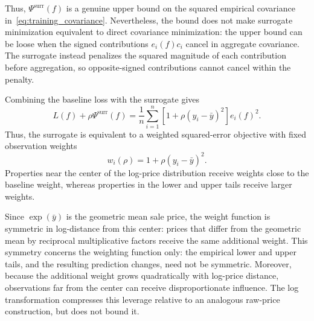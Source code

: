 \documentclass[10pt]{article}
\theoremstyle{definition}
\newcommand{\1}{\mathbf{1}}
\begin{document}
{{{Thus, $\Psi^{\mathrm{surr}}(f)$ is a genuine upper bound on the squared empirical covariance in~\eqref{eq:training_covariance}. Nevertheless, the bound does not make surrogate minimization equivalent to direct covariance minimization: the upper bound can be loose when the signed contributions $e_i(f)c_i$ cancel in aggregate covariance. The surrogate instead penalizes the squared magnitude of each contribution before aggregation, so opposite-signed contributions cannot cancel within the penalty.}

Combining the baseline loss with the surrogate gives
\begin{equation}
\label{eq:surrogate_weighted_loss}
L(f)+\rho\Psi^{\mathrm{surr}}(f)
=
\frac{1}{n}\sum_{i=1}^n
\left[1+\rho(y_i-\bar y)^2\right]e_i(f)^2.
\end{equation}
Thus, the surrogate is equivalent to a weighted squared-error objective with fixed observation weights
\begin{equation}
\label{eq:surrogate_weights}
w_i(\rho)=1+\rho(y_i-\bar y)^2.
\end{equation}
Properties near the center of the log-price distribution receive weights close to the baseline weight, whereas properties in the lower and upper tails receive larger weights.




{Since $\exp(\bar y)$ is the geometric mean sale price, the weight function is symmetric in log-distance from this center: prices that differ from the geometric mean by reciprocal multiplicative factors receive the same additional weight. This symmetry concerns the weighting function only: the empirical lower and upper tails, and the resulting prediction changes, need not be symmetric. Moreover, because the additional weight grows quadratically with log-price distance, observations far from the center can receive disproportionate influence. The log transformation compresses this leverage relative to an analogous raw-price construction, but does not bound it.}

}}
\end{document}
